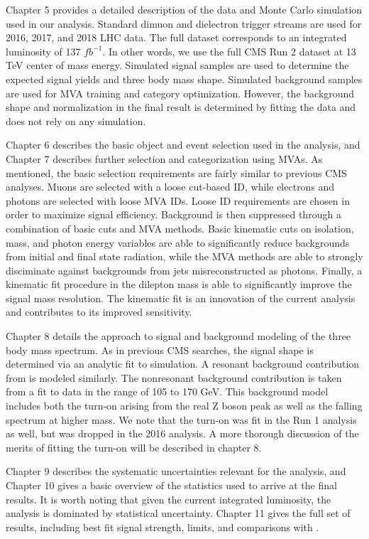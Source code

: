Chapter 5 provides a detailed description of the data and Monte Carlo simulation 
used in our analysis. Standard dimuon and dielectron trigger streams are used for 2016, 2017, 
and 2018 LHC data. The full dataset corresponds to an integrated luminosity of 
137 $fb^{-1}$. In other words, we use the full CMS Run 2 dataset at 13 TeV center of 
mass energy. Simulated signal samples are used to determine the expected signal yields 
and three body mass shape. Simulated background samples are used for MVA training 
and category optimization. However, the background shape and normalization in the final result
is determined by fitting the data and does not rely on any simulation.

Chapter 6 describes the basic object and event selection used in the analysis, and Chapter 7 
describes further selection and categorization using MVAs. As mentioned, the basic 
selection requirements are fairly similar to previous CMS analyses. Muons are selected with 
a loose cut-based ID, while electrons and photons are selected with loose MVA IDs. Loose ID
requirements are chosen in order to maximize signal efficiency. Background is then suppressed 
through a combination of basic cuts and MVA methods. Basic kinematic cuts on isolation, mass, 
and photon energy variables are able to significantly reduce backgrounds from initial and final 
state radiation, while the MVA methods are able to strongly disciminate against backgrounds from 
jets misreconstructed as photons. Finally, a kinematic fit procedure in the dilepton mass 
is able to significantly improve the signal mass resolution. The kinematic fit is an 
innovation of the current analysis and contributes to its improved sensitivity.

Chapter 8 details the approach to signal and background modeling of the three body 
mass spectrum. As in previous CMS \hzg searches, the 
signal shape is determined via an analytic fit to simulation. A resonant background 
contribution from \hmumu is modeled similarly. The nonresonant 
background contribution is taken from a fit to data in the range of 105 to 170 GeV. This 
background model includes both the turn-on arising from the real Z boson peak as well as 
the falling spectrum at higher mass. We note that the turn-on was fit in the Run 1 analysis as 
well, but was dropped in the 2016 analysis. A more thorough discussion of the merits of fitting 
the turn-on will be described in chapter 8.

Chapter 9 describes the systematic uncertainties relevant for the analysis, and Chapter 10
gives a basic overview of the statistics used to arrive at the final results. It is 
worth noting that given the current integrated luminosity, the analysis is dominated by 
statistical uncertainty. Chapter 11 gives the full set of results, including best fit 
signal strength, limits, and comparisons with \hgg. 


